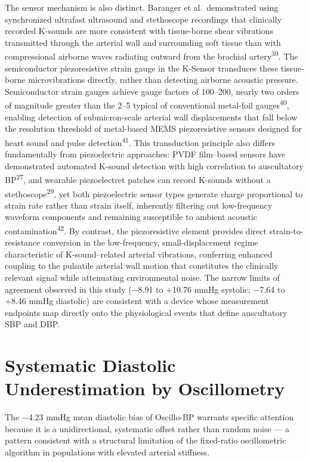 \documentclass[
  12pt,
  letterpaper,
  openany,
  oneside]{book}
\begin{document}
The sensor mechanism is also distinct. Baranger et al.~demonstrated
using synchronized ultrafast ultrasound and stethoscope recordings that
clinically recorded K-sounds are more consistent with tissue-borne shear
vibrations transmitted through the arterial wall and surrounding soft
tissue than with compressional airborne waves radiating outward from the
brachial artery\textsuperscript{39}. The semiconductor piezoresistive
strain gauge in the K-Sensor transduces these tissue-borne
microvibrations directly, rather than detecting airborne acoustic
pressure. Semiconductor strain gauges achieve gauge factors of 100--200,
nearly two orders of magnitude greater than the 2--5 typical of
conventional metal-foil gauges\textsuperscript{40}, enabling detection
of submicron-scale arterial wall displacements that fall below the
resolution threshold of metal-based MEMS piezoresistive sensors designed
for heart sound and pulse detection\textsuperscript{41}. This
transduction principle also differs fundamentally from piezoelectric
approaches: PVDF film--based sensors have demonstrated automated K-sound
detection with high correlation to auscultatory BP\textsuperscript{27},
and wearable piezoelectret patches can record K-sounds without a
stethoscope\textsuperscript{29}, yet both piezoelectric sensor types
generate charge proportional to strain rate rather than strain itself,
inherently filtering out low-frequency waveform components and remaining
susceptible to ambient acoustic contamination\textsuperscript{42}. By
contrast, the piezoresistive element provides direct
strain-to-resistance conversion in the low-frequency, small-displacement
regime characteristic of K-sound--related arterial vibrations,
conferring enhanced coupling to the pulsatile arterial wall motion that
constitutes the clinically relevant signal while attenuating
environmental noise. The narrow limits of agreement observed in this
study (−8.91 to +10.76 mmHg systolic; −7.64 to +8.46 mmHg diastolic) are
consistent with a device whose measurement endpoints map directly onto
the physiological events that define auscultatory SBP and DBP.

\section{Systematic Diastolic Underestimation by
Oscillometry}\label{systematic-diastolic-underestimation-by-oscillometry}

The −4.23 mmHg mean diastolic bias of Oscillo-BP warrants specific
attention because it is a unidirectional, systematic offset rather than
random noise --- a pattern consistent with a structural limitation of
the fixed-ratio oscillometric algorithm in populations with elevated
arterial stiffness.
\end{document}
